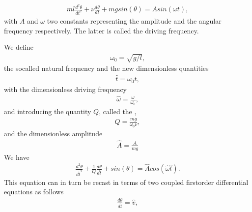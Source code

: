 \documentclass[letterpaper,10pt,english]{sphinxmanual}
\begin{document}
\begin{equation*}
\begin{split}
\begin{equation}
   ml\frac{d^2\theta}{dt^2}+\nu\frac{d\theta}{dt}  +mgsin(\theta)=Asin(\omega t), 
\label{_auto72} \tag{96}
\end{equation}
\end{split}
\end{equation*}
with \(A\) and \(\omega\) two constants representing the amplitude and
the angular frequency respectively. The latter is called the driving frequency.

We define
\begin{equation*}
\begin{split}
\omega_0=\sqrt{g/l},
\end{split}
\end{equation*}
the so\sphinxhyphen{}called natural frequency and the new dimensionless quantities
\begin{equation*}
\begin{split}
\hat{t}=\omega_0t,
\end{split}
\end{equation*}
with the dimensionless driving frequency
\begin{equation*}
\begin{split}
\hat{\omega}=\frac{\omega}{\omega_0},
\end{split}
\end{equation*}
and introducing the quantity \(Q\), called the ,
\begin{equation*}
\begin{split}
Q=\frac{mg}{\omega_0\nu},
\end{split}
\end{equation*}
and the dimensionless amplitude
\begin{equation*}
\begin{split}
\hat{A}=\frac{A}{mg}
\end{split}
\end{equation*}
We have
\begin{equation*}
\begin{split}
\frac{d^2\theta}{d\hat{t}^2}+\frac{1}{Q}\frac{d\theta}{d\hat{t}}  
     +sin(\theta)=\hat{A}cos(\hat{\omega}\hat{t}).
\end{split}
\end{equation*}
This equation can in turn be recast in terms of two coupled first\sphinxhyphen{}order differential equations as follows
\begin{equation*}
\begin{split}
\frac{d\theta}{d\hat{t}}=\hat{v},
\end{split}
\end{equation*}
\end{document}
